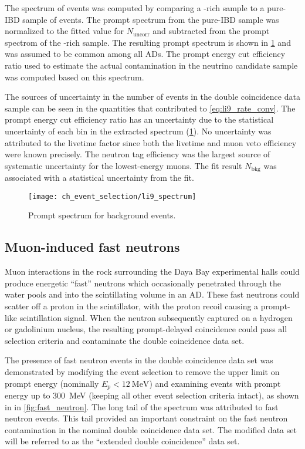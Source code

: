 The spectrum of \li{} events was computed
by comparing a \li{}-rich sample to a pure-IBD sample of events.
The prompt spectrum from the pure-IBD sample
was normalized to the fitted value for $N_\text{uncorr}$
and subtracted from the prompt spectrom of the \li{}-rich sample.
The resulting \li{} prompt spectrum is shown in \cref{fig:li9_spec}
and was assumed to be common among all ADs.
The prompt energy cut efficiency ratio
used to estimate the actual contamination in the neutrino candidate sample
was computed based on this spectrum.

The sources of uncertainty in the number of \li{} events
in the double coincidence data sample
can be seen in the quantities that contributed to \cref{eq:li9_rate_conv}.
The prompt energy cut efficiency ratio has an uncertainty
due to the statistical uncertainty of each bin in the extracted \li{} spectrum
(\cref{fig:li9_spec}).
No uncertainty was attributed to the livetime factor since
both the livetime and muon veto efficiency were known precisely.
The neutron tag efficiency
was the largest source of systematic uncertainty for the lowest-energy muons.
The fit result $N_\text{bkg}$ was associated with a statistical uncertainty
from the fit.

\begin{figure}
    \centering
    \texttt{[image: ch\_event\_selection/li9\_spectrum]}
    \caption{
        Prompt spectrum for \li{} background events.
    }
    \label{fig:li9_spec}
\end{figure}

\subsection{Muon-induced fast neutrons}
\label{subsec:fastn}

Muon interactions in the rock surrounding the Daya Bay experimental halls
could produce energetic ``fast'' neutrons
which occasionally penetrated through the water pools
and into the scintillating volume in an AD.
These fast neutrons could scatter off a proton in the scintillator,
with the proton recoil causing a prompt-like scintillation signal.
When the neutron subsequently captured on a hydrogen or gadolinium nucleus,
the resulting prompt-delayed coincidence
could pass all selection criteria and contaminate the double coincidence data set.

The presence of fast neutron events in the double coincidence data set
was demonstrated by modifying the event selection
to remove the upper limit on prompt energy (nominally $E_p < \SI{12}{\MeV}$)
and examining events with prompt energy up to \SI{300}{\MeV}
(keeping all other event selection criteria intact),
as shown in in \cref{fig:fast_neutron}.
The long tail of the spectrum was attributed to fast neutron events.
This tail provided an important constraint on the fast neutron contamination
in the nominal double coincidence data set.
The modified data set will be referred to as the
``extended double coincidence'' data set.

